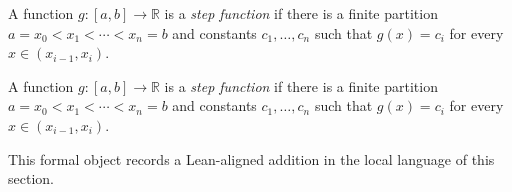 \begin{definition}
\label{def:is-step-function}
A function $g:[a,b]\to\mathbb R$ is a \emph{step function} if there is a finite partition $a=x_0<x_1<\cdots<x_n=b$ and constants $c_1,\ldots,c_n$ such that $g(x)=c_i$ for every $x\in(x_{i-1},x_i)$.
\end{definition}

\begin{remark*}
A function $g:[a,b]\to\mathbb R$ is a \emph{step function} if there is a finite partition $a=x_0<x_1<\cdots<x_n=b$ and constants $c_1,\ldots,c_n$ such that $g(x)=c_i$ for every $x\in(x_{i-1},x_i)$.
\end{remark*}

\begin{remark*}[Interpretation]
This formal object records a Lean-aligned addition in the local language of this section.
\end{remark*}

\begin{dependencies}
\NoLocalDependencies
\end{dependencies}
